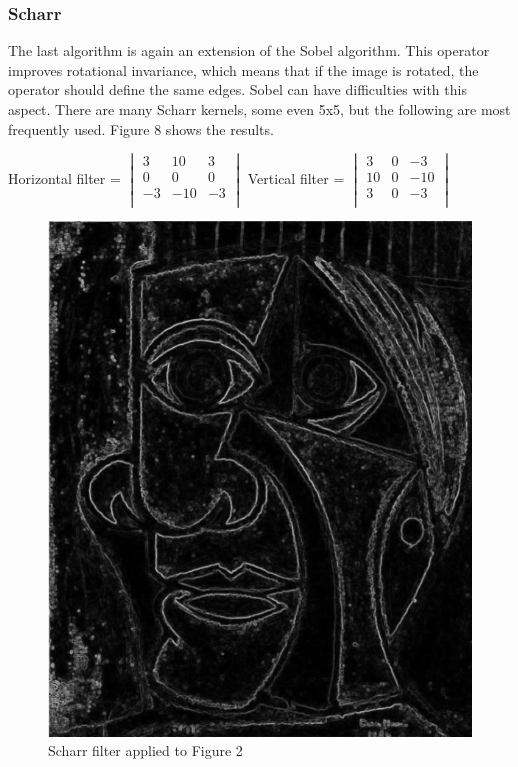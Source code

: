 \documentclass[12pt]{article}
\begin{document}
\subsubsection{Scharr}
The last algorithm is again an extension of the Sobel algorithm. This operator improves rotational invariance, which means that if the image is rotated, the operator should define the same edges. Sobel can have difficulties with this aspect. There are many Scharr kernels, some even 5x5, but the following are most frequently used. Figure 8 shows the results.
\newline

Horizontal filter = $\begin{vmatrix}
        3 & 10 & 3\\
        0 & 0 & 0\\
        -3 & -10 & -3\\
\end{vmatrix}$\hspace{11mm}
Vertical filter = $\begin{vmatrix}
        3 & 0 & -3\\
        10 & 0 & -10\\
        3 & 0 & -3\\
\end{vmatrix}$\hspace{5mm}

\begin{figure}[h]
\centering
\includegraphics[scale = 0.39]{img/picassoScharr}
\caption{Scharr filter applied to Figure 2}
\end{figure}
\newpage
\end{document}
